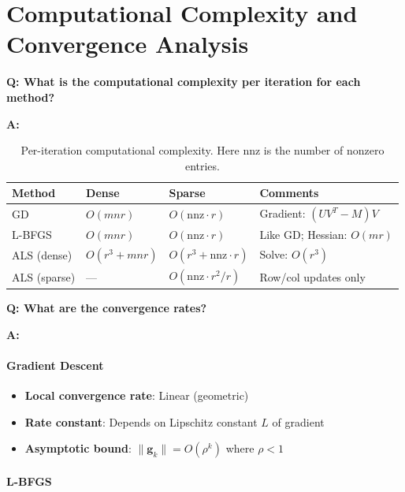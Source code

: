 \documentclass[11pt,oneside]{article}
\newcommand{\question}[1]{\textbf{Q: #1}}
\newcommand{\answer}{\textbf{A: }}
\begin{document}
\section{Computational Complexity and Convergence Analysis}\label{sec:complexity}

\question{What is the computational complexity per iteration for each method?}

\answer

\begin{table}[h]
\centering
\small
\begin{tabular}{lllp{3cm}}
\toprule
\textbf{Method} & \textbf{Dense} & \textbf{Sparse} & \textbf{Comments} \\
\midrule
GD & $O(mnr)$ & $O(\text{nnz} \cdot r)$ & Gradient: $(UV^T - M)V$ \\
L-BFGS & $O(mnr)$ & $O(\text{nnz} \cdot r)$ & Like GD; Hessian: $O(mr)$ \\
ALS (dense) & $O(r^3 + mnr)$ & $O(r^3 + \text{nnz} \cdot r)$ & Solve: $O(r^3)$ \\
ALS (sparse) & --- & $O(\text{nnz} \cdot r^2/r)$ & Row/col updates only \\
\bottomrule
\end{tabular}
\caption{Per-iteration computational complexity. Here $\text{nnz}$ is the number of nonzero entries.}
\end{table}

\medskip

\question{What are the convergence rates?}

\answer

\paragraph{Gradient Descent}

\begin{itemize}
    \item \textbf{Local convergence rate}: Linear (geometric)
    \item \textbf{Rate constant}: Depends on Lipschitz constant $L$ of gradient
    \item \textbf{Asymptotic bound}: $\|\mathbf{g}_k\| = O(\rho^k)$ where $\rho < 1$
\end{itemize}

\paragraph{L-BFGS}
\end{document}
